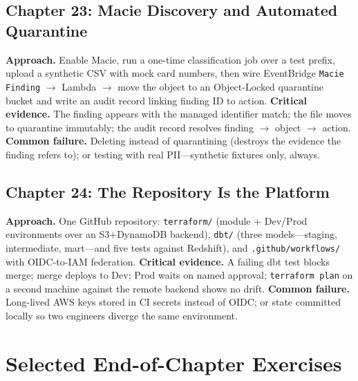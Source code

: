 \subsection{Chapter 23: Macie Discovery and Automated Quarantine}
\textbf{Approach.} Enable Macie, run a one-time classification job over a test prefix, upload a
synthetic CSV with mock card numbers, then wire EventBridge \texttt{Macie Finding}
$\rightarrow$ Lambda $\rightarrow$ move the object to an Object-Locked quarantine bucket and
write an audit record linking finding ID to action.
\textbf{Critical evidence.} The finding appears with the managed identifier match; the file moves
to quarantine immutably; the audit record resolves finding $\rightarrow$ object $\rightarrow$
action.
\textbf{Common failure.} Deleting instead of quarantining (destroys the evidence the finding
refers to); or testing with real PII---synthetic fixtures only, always.

\subsection{Chapter 24: The Repository Is the Platform}
\textbf{Approach.} One GitHub repository: \texttt{terraform/} (module + Dev/Prod environments
over an S3+DynamoDB backend), \texttt{dbt/} (three models---staging, intermediate, mart---and
five tests against Redshift), and \texttt{.github/workflows/} with OIDC-to-IAM federation.
\textbf{Critical evidence.} A failing dbt test blocks merge; merge deploys to Dev; Prod waits on
named approval; \texttt{terraform plan} on a second machine against the remote backend shows no
drift.
\textbf{Common failure.} Long-lived AWS keys stored in CI secrets instead of OIDC; or state
committed locally so two engineers diverge the same environment.

\section{Selected End-of-Chapter Exercises}
%
